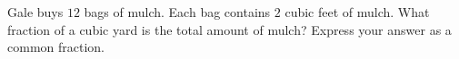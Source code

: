 Gale buys $12$ bags of mulch. Each bag contains $2$ cubic feet of mulch. What fraction of a cubic yard is the total amount of mulch? Express your answer as a common fraction.
